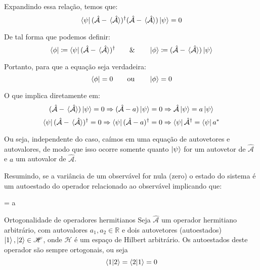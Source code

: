     Expandindo essa relação, temos que:
        \begin{equation*}
            \bra{\psi}(\hat{\mathcal{A}} - \expval*{\hat{\mathcal{A}}})^{\dagger}(\hat{\mathcal{A}} - \expval*{\hat{\mathcal{A}}})\ket{\psi} = 0
        \end{equation*}
    
    De tal forma que podemos definir:
        \begin{equation*}
            \bra{\phi} \coloneqq \bra{\psi}(\hat{\mathcal{A}} - \expval*{\hat{\mathcal{A}}})^{\dagger} \qquad \& \qquad 
            \ket{\phi} \coloneqq (\hat{\mathcal{A}} - \expval*{\hat{\mathcal{A}}})\ket{\psi}
        \end{equation*}
    
    Portanto, para que a equação seja verdadeira:
        \begin{equation*}
            \bra{\phi} = 0 \qquad \textrm{ou} \qquad \ket{\phi} = 0
        \end{equation*}
    
    O que implica diretamente em:
        \begin{equation*}
            (\hat{\mathcal{A}} - \expval*{\hat{\mathcal{A}}})\ket{\psi} = 0 \Rightarrow 
            (\hat{\mathcal{A}} - a)\ket{\psi} = 0 \Rightarrow \hat{\mathcal{A}}\ket{\psi} = a\ket{\psi}
        \end{equation*}
        \begin{equation*}
            \bra{\psi}(\hat{\mathcal{A}} - \expval*{\hat{\mathcal{A}}})^{\dagger} = 0 \Rightarrow 
            \bra{\psi}(\hat{\mathcal{A}} - a)^{\dagger} = 0 \Rightarrow 
            \bra{\psi}\hat{\mathcal{A}}^{\dagger} = \bra{\psi}a^{\ast}
        \end{equation*}
    
    Ou seja, independente do caso, caímos em uma equação de autovetores e autovalores, de modo que isso ocorre somente quanto $\ket{\psi}$ for um autovetor de $\hat{\mathcal{A}}$ e $a$ um autovalor de $\hat{\mathcal{A}}$. 
    
    Resumindo, se a variância de um observável for nula (zero) o estado do sistema é um autoestado do operador relacionado ao observável implicando que:
        \begin{answer}\label{eq: autoestados}
                \ket{\psi} = a\ket{\psi}
        \end{answer}
    
    \begin{theorem}{Ortogonalidade de operadores hermitianos}{}
        Seja $\hat{\mathcal{A}}$ um operador hermitiano arbitrário, com autovalores $a_{1},a_{2}\in\mathbb{R}$ e dois autovetores (autoestados) $\ket{1},\ket{2}\in\mathscr{H}$, onde $\mathscr{H}$ é um espaço de Hilbert arbitrário. Os autoestados deste operador são sempre ortogonais, ou seja
            \begin{equation*}
                \braket{1}{2} = \braket{2}{1} = 0
            \end{equation*}
    \end{theorem}
    
